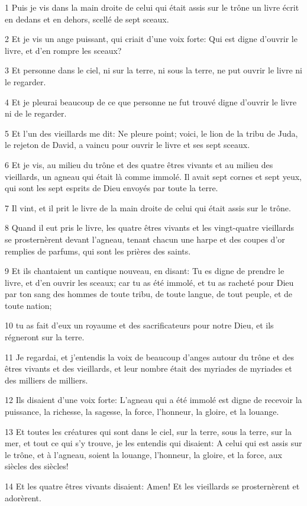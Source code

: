 \par 1 Puis je vis dans la main droite de celui qui était assis sur le trône un livre écrit en dedans et en dehors, scellé de sept sceaux.
\par 2 Et je vis un ange puissant, qui criait d'une voix forte: Qui est digne d'ouvrir le livre, et d'en rompre les sceaux?
\par 3 Et personne dans le ciel, ni sur la terre, ni sous la terre, ne put ouvrir le livre ni le regarder.
\par 4 Et je pleurai beaucoup de ce que personne ne fut trouvé digne d'ouvrir le livre ni de le regarder.
\par 5 Et l'un des vieillards me dit: Ne pleure point; voici, le lion de la tribu de Juda, le rejeton de David, a vaincu pour ouvrir le livre et ses sept sceaux.
\par 6 Et je vis, au milieu du trône et des quatre êtres vivants et au milieu des vieillards, un agneau qui était là comme immolé. Il avait sept cornes et sept yeux, qui sont les sept esprits de Dieu envoyés par toute la terre.
\par 7 Il vint, et il prit le livre de la main droite de celui qui était assis sur le trône.
\par 8 Quand il eut pris le livre, les quatre êtres vivants et les vingt-quatre vieillards se prosternèrent devant l'agneau, tenant chacun une harpe et des coupes d'or remplies de parfums, qui sont les prières des saints.
\par 9 Et ils chantaient un cantique nouveau, en disant: Tu es digne de prendre le livre, et d'en ouvrir les sceaux; car tu as été immolé, et tu as racheté pour Dieu par ton sang des hommes de toute tribu, de toute langue, de tout peuple, et de toute nation;
\par 10 tu as fait d'eux un royaume et des sacrificateurs pour notre Dieu, et ils régneront sur la terre.
\par 11 Je regardai, et j'entendis la voix de beaucoup d'anges autour du trône et des êtres vivants et des vieillards, et leur nombre était des myriades de myriades et des milliers de milliers.
\par 12 Ils disaient d'une voix forte: L'agneau qui a été immolé est digne de recevoir la puissance, la richesse, la sagesse, la force, l'honneur, la gloire, et la louange.
\par 13 Et toutes les créatures qui sont dans le ciel, sur la terre, sous la terre, sur la mer, et tout ce qui s'y trouve, je les entendis qui disaient: A celui qui est assis sur le trône, et à l'agneau, soient la louange, l'honneur, la gloire, et la force, aux siècles des siècles!
\par 14 Et les quatre êtres vivants disaient: Amen! Et les vieillards se prosternèrent et adorèrent.

